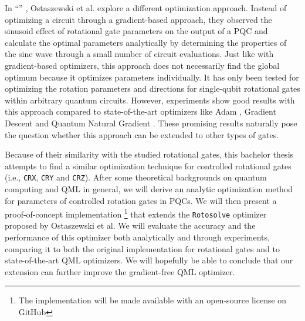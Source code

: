 In ``\emph{}''
\cite{ostaszewski_structure_2021}, Ostaszewski et al. explore a different
optimization approach.
Instead of optimizing a circuit through a gradient-based approach, they observed
the sinusoid effect of rotational gate parameters on the output of a PQC and
calculate the optimal parameters analytically by determining the properties of
the sine wave through a small number of circuit evaluations. 
Just like with gradient-based optimizers, this approach does not necessarily
find the global optimum because it optimizes parameters individually.
It has only been tested for optimizing the rotation parameters and directions
for single-qubit rotational gates within arbitrary quantum circuits.
However, experiments show good results with this approach compared to
state-of-the-art optimizers like Adam \cite{kingma_adam_2017},
Gradient Descent and Quantum Natural Gradient \cite{stokes_quantum_2020}.
These promising results naturally pose the question whether this approach can be
extended to other types of gates.

Because of their similarity with the studied rotational gates, this bachelor
thesis attempts to find a similar optimization technique for controlled
rotational gates (i.e., \texttt{CRX}, \texttt{CRY} and \texttt{CRZ}).
After some theoretical backgrounds on quantum computing and QML in general, we
will derive an analytic optimization method for parameters of controlled
rotation gates in PQCs.
We will then present a proof-of-concept implementation%
\footnote{The implementation will be made available with an open-source license
on GitHub}
that extends the \texttt{Rotosolve} optimizer proposed by Ostaszewski et al.
We will evaluate the accuracy and the performance of this optimizer both
analytically and through experiments, comparing it to both the original
implementation for rotational gates and to state-of-the-art QML optimizers.
We will hopefully be able to conclude that our extension can further improve the
gradient-free QML optimizer.
